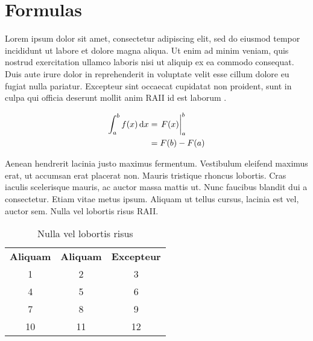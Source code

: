 \section{Formulas}

Lorem ipsum dolor sit amet, consectetur adipiscing elit, sed do eiusmod tempor
incididunt ut labore et dolore magna aliqua. Ut enim ad minim veniam, quis nostrud
exercitation ullamco laboris nisi ut aliquip ex ea commodo consequat. Duis aute
irure dolor in reprehenderit in voluptate velit esse cillum dolore eu fugiat nulla
pariatur. Excepteur sint occaecat cupidatat non proident, sunt in culpa qui officia
deserunt mollit anim \gls{RAII} id est laborum .

\begin{align}
    \int_a^b f(x) \diff x &= \evalat{F(x)}{a}{b} \\
                          &= F(b) - F(a)           
\end{align}

Aenean hendrerit lacinia justo maximus fermentum. Vestibulum eleifend maximus erat,
ut accumsan erat placerat non. Mauris tristique rhoncus lobortis. Cras iaculis
scelerisque mauris, ac auctor massa mattis ut. Nunc faucibus blandit dui a consectetur.
Etiam vitae metus ipsum. Aliquam ut tellus cursus, lacinia est vel, auctor sem.
Nulla vel lobortis risus \gls{RAII}.

\begin{table}[ht]
    \centering
    \begin{tabular}{ccc}
        \textbf{Aliquam} & \textbf{Aliquam} & \textbf{Excepteur} \\
                 1       & 2    & 3                              \\
                 4       & 5    & 6                              \\
                 7       & 8    & 9                              \\
                 10      & 11   & 12
    \end{tabular}
    \caption{Nulla vel lobortis risus}\label{tab:test}
\end{table}